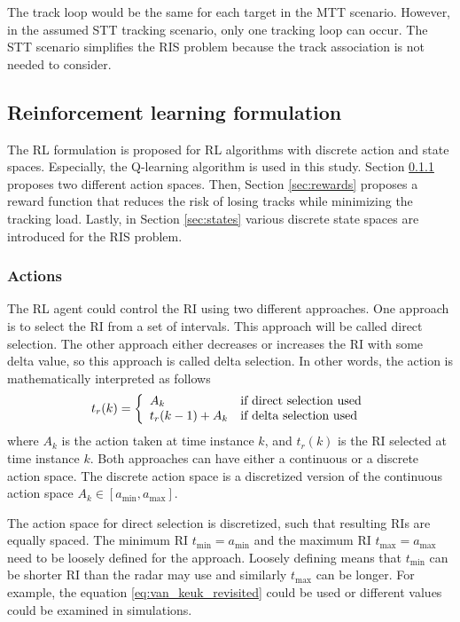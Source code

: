 \documentclass[english, 12pt, a4paper, elec, utf8, a-1b, online]{aaltothesis}
\numberwithin{equation}{section}
\newcommand{\amax}{a_\text{max}}
\newcommand{\amin}{a_\text{min}}
\newcommand{\tmax}{t_\text{max}}
\newcommand{\tmin}{t_\text{min}}
\newcommand{\ri}{t_r}
\begin{document}
The track loop would be the same for each target in the MTT scenario. 
However, in the assumed STT tracking scenario, only one tracking loop can occur. 
The STT scenario simplifies the RIS problem because the track association is not needed to consider.


\subsection{Reinforcement learning formulation}\label{sec:RL_formulation}

The RL formulation is proposed for RL algorithms with discrete action and state spaces. 
Especially, the Q-learning algorithm is used in this study. 
Section \ref{sec:actions} proposes two different action spaces.
Then, Section \ref{sec:rewards} proposes a reward function that reduces the risk of losing tracks while minimizing the tracking load. 
Lastly, in Section \ref{sec:states} various discrete state spaces are introduced for the RIS problem.

\subsubsection{Actions} \label{sec:actions}

The RL agent could control the RI using two different approaches.
One approach is to select the RI from a set of intervals.
This approach will be called direct selection.
The other approach either decreases or increases the RI with some delta value, so this approach is called delta selection.
In other words, the action is mathematically interpreted as follows
\begin{equation}
    \ri(k) = \left\{
        \begin{array}{l l}
            A_k & \text{if direct selection used} \\
            \ri(k-1) + A_k &  \text{if delta selection used}
        \end{array}\right.
\end{equation}
where $A_k$ is the action taken at time instance $k$, and $\ri(k)$ is the RI selected at time instance $k$.
Both approaches can have either a continuous or a discrete action space.
The discrete action space is a discretized version of the continuous action space $A_k \in [\amin, \amax]$.

The action space for direct selection is discretized, such that resulting RIs are equally spaced.
The minimum RI $\tmin=\amin$ and the maximum RI $\tmax=\amax$ need to be loosely defined for the approach. 
Loosely defining means that $\tmin$ can be shorter RI than the radar may use and similarly $\tmax$ can be longer.
For example, the equation \eqref{eq:van_keuk_revisited} could be used or different values could be examined in simulations. 
\end{document}

